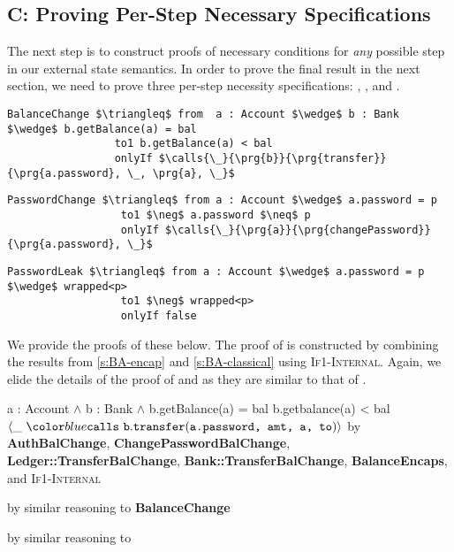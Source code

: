 \subsection{C: Proving Per-Step Necessary Specifications}
The next step is to construct proofs of necessary conditions for
\emph{any} possible step in our external state semantics.
In order to prove the final result in the next section,
we need to prove three per-step necessity specifications: , , and .
\begin{lstlisting}[language = Chainmail, mathescape=true, frame=lines]
BalanceChange $\triangleq$ from  a : Account $\wedge$ b : Bank $\wedge$ b.getBalance(a) = bal
                 to1 b.getBalance(a) < bal
                 onlyIf $\calls{\_}{\prg{b}}{\prg{transfer}}{\prg{a.password}, \_, \prg{a}, \_}$
\end{lstlisting}
\begin{lstlisting}[language = Chainmail, mathescape=true, frame=lines]
PasswordChange $\triangleq$ from a : Account $\wedge$ a.password = p
                  to1 $\neg$ a.password $\neq$ p
                  onlyIf $\calls{\_}{\prg{a}}{\prg{changePassword}}{\prg{a.password}, \_}$
\end{lstlisting}
\begin{lstlisting}[language = Chainmail, mathescape=true, frame=lines]
PasswordLeak $\triangleq$ from a : Account $\wedge$ a.password = p $\wedge$ wrapped<p>
                  to1 $\neg$ wrapped<p>
                  onlyIf false
\end{lstlisting}
We provide the proofs of these below. The proof of  is constructed
by combining the results from \ref{s:BA-encap} and \ref{s:BA-classical} using \textsc{If1-Internal}. 
Again, we elide the details of the proof of  and  as they are similar to that
of . \\
\noindent
\begin{proofexample}
	{\proofstepwithrule
			{\onlyIfSingleEx
					{a : Account $\wedge$ b : Bank $\wedge$ b.getBalance(a) = bal}
					{b.getbalance(a) < bal}
					{$\calls{\_}{\prg{b}}{\prg{transfer}}{\prg{a.password, amt, a, to}}$}
					}
				{by \textbf{AuthBalChange}, \textbf{ChangePasswordBalChange}, \textbf{Ledger::TransferBalChange}, \textbf{Bank::TransferBalChange}, \textbf{BalanceEncaps}, and \textsc{If1-Internal}}
		}
\endproofsteps
\end{proofexample}
\begin{proofexample}
	{
			{by similar reasoning to \textbf{BalanceChange}}
	}
\endproofsteps
\end{proofexample}
\begin{proofexample}
	{
			{by similar reasoning to }
	}
\endproofsteps
\end{proofexample}
